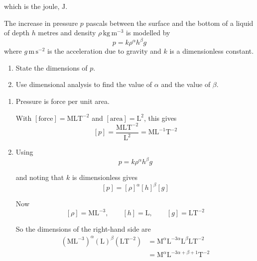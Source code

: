 \documentclass[leqno]{article}
\begin{document}
\begin{enumerate}[
  label=\textbf{\arabic*.},
  leftmargin=*,
  topsep=0pt,
  partopsep=0pt,
  parsep=0pt
]
\begin{djsSolution}
\begin{enumerate}[label=\textbf{(\alph*)}, start=1]
  which is the joule, \(\mathrm{J}\).
\end{enumerate}
\end{djsSolution}


\newpage

\questionitem

The increase in pressure $p$ pascals between the surface and the bottom of a liquid of depth $h$ metres and density $\rho\,\mathrm{kg\,m^{-3}}$ is modelled by
\[
p = k\rho^{\alpha}h^{\beta}g
\]
where $g\,\mathrm{m\,s^{-2}}$ is the acceleration due to gravity and $k$ is a dimensionless constant. \\
\begin{enumerate}[label=\textbf{(\alph*)}]
  \item State the dimensions of $p$.  \\
  \item Use dimensional analysis to find the value of $\alpha$ and the value of $\beta$.  \\
\end{enumerate}

\vspace*{10pt}

\begin{djsSolution}
\begin{enumerate}[label=\textbf{(\alph*)}, start=1]
  \item Pressure is force per unit area.

  With \([\text{force}] = \mathrm{MLT^{-2}}\) and \([\text{area}] = \mathrm{L^2}\), this gives
  \[
  [p] = \frac{\mathrm{MLT^{-2}}}{\mathrm{L^2}} = \mathrm{ML^{-1}T^{-2}}
  \]

  \item Using
  \[
  p = k\rho^{\alpha}h^{\beta}g
  \]

  and noting that \(k\) is dimensionless gives
  \[
  [p] = [\rho]^{\alpha}[h]^{\beta}[g]
  \]

  Now
  \[
  [\rho] = \mathrm{ML^{-3}}, \qquad [h] = \mathrm{L}, \qquad [g] = \mathrm{LT^{-2}}
  \]

  So the dimensions of the right-hand side are
  \begin{align*}
  (\mathrm{ML^{-3}})^{\alpha}(\mathrm{L})^{\beta}(\mathrm{LT^{-2}})
  &= \mathrm{M}^{\alpha}\mathrm{L}^{-3\alpha}\mathrm{L}^{\beta}\mathrm{LT^{-2}} \\
  &= \mathrm{M}^{\alpha}\mathrm{L}^{-3\alpha+\beta+1}\mathrm{T^{-2}}
  \end{align*}


\end{enumerate}
\end{djsSolution}
\end{enumerate}
\end{document}
